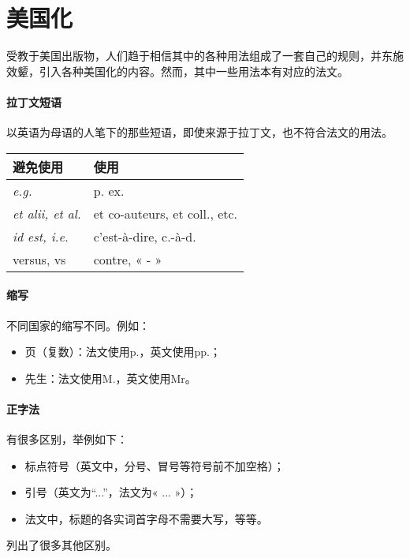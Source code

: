 \section{美国化}

受教于美国出版物，人们趋于相信其中的各种用法组成了一套自己的规则，并东施效颦，引入各种美国化的内容。然而，其中一些用法本有对应的法文。

\paragraph*{拉丁文短语} 以英语为母语的人笔下的那些短语，即使来源于拉丁文，也不符合法文的用法。

\begin{center}
    \begin{tabular}{|l|l|}
        \hline
        避免使用 & 使用 \\
        \hline
        \emph{e.g.} & p. ex. \\
        \emph{et alii, et al.} & et co-auteurs, et coll., etc.\\
        \emph{id est, i.e.} & c'est-à-dire, c.-à-d.\\
        versus, vs & contre, « - » \\
        \hline
    \end{tabular}
\end{center}

\paragraph*{缩写} 不同国家的缩写不同。例如：

\begin{itemize}
    \item 页（复数）：法文使用p.，英文使用pp.；
    \item 先生：法文使用M.，英文使用Mr。
\end{itemize}

\paragraph*{正字法} 有很多区别，举例如下：

\begin{itemize}
    \item 标点符号（英文中，分号、冒号等符号前不加空格）；
    \item 引号（英文为``...''，法文为« ... »）；
    \item 法文中，标题的各实词首字母不需要大写，等等。
\end{itemize}

 列出了很多其他区别。
